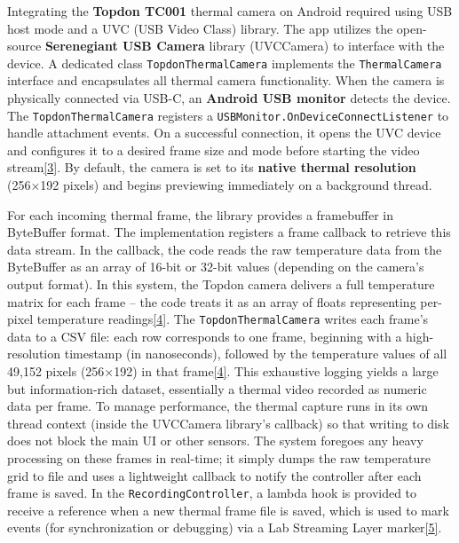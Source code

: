 \documentclass[12pt,a4paper]{article}
\begin{document}
Integrating the \textbf{Topdon TC001} thermal camera on Android required using USB host mode and a UVC (USB Video Class) library. The app utilizes the open-source \textbf{Serenegiant USB Camera} library (UVCCamera) to interface with the device. A dedicated class \passthrough{\lstinline!TopdonThermalCamera!} implements the \passthrough{\lstinline!ThermalCamera!} interface and encapsulates all thermal camera functionality. When the camera is physically connected via USB-C, an \textbf{Android USB monitor} detects the device. The \passthrough{\lstinline!TopdonThermalCamera!} registers a \passthrough{\lstinline!USBMonitor.OnDeviceConnectListener!} to handle attachment events. On a successful connection, it opens the UVC device and configures it to a desired frame size and mode before starting the video stream\href{https://github.com/buccancs/GSR-Dual-Video-System/blob/05ae360cb7b4ae7c7861f72deb235ad64a74b38e/android/app/src/main/java/com/yourcompany/gsrcapture/hardware/TopdonThermalCamera.kt\#L84-L92}{{[}3{]}}. By default, the camera is set to its \textbf{native thermal resolution} (256×192 pixels) and begins previewing immediately on a background thread.

For each incoming thermal frame, the library provides a framebuffer in ByteBuffer format. The implementation registers a frame callback to retrieve this data stream. In the callback, the code reads the raw temperature data from the ByteBuffer as an array of 16-bit or 32-bit values (depending on the camera's output format). In this system, the Topdon camera delivers a full temperature matrix for each frame -- the code treats it as an array of floats representing per-pixel temperature readings\href{https://github.com/buccancs/GSR-Dual-Video-System/blob/05ae360cb7b4ae7c7861f72deb235ad64a74b38e/android/app/src/main/java/com/yourcompany/gsrcapture/hardware/TopdonThermalCamera.kt\#L54-L62}{{[}4{]}}. The \passthrough{\lstinline!TopdonThermalCamera!} writes each frame's data to a CSV file: each row corresponds to one frame, beginning with a high-resolution timestamp (in nanoseconds), followed by the temperature values of all 49,152 pixels (256×192) in that frame\href{https://github.com/buccancs/GSR-Dual-Video-System/blob/05ae360cb7b4ae7c7861f72deb235ad64a74b38e/android/app/src/main/java/com/yourcompany/gsrcapture/hardware/TopdonThermalCamera.kt\#L54-L62}{{[}4{]}}. This exhaustive logging yields a large but information-rich dataset, essentially a thermal video recorded as numeric data per frame. To manage performance, the thermal capture runs in its own thread context (inside the UVCCamera library's callback) so that writing to disk does not block the main UI or other sensors. The system foregoes any heavy processing on these frames in real-time; it simply dumps the raw temperature grid to file and uses a lightweight callback to notify the controller after each frame is saved. In the \passthrough{\lstinline!RecordingController!}, a lambda hook is provided to receive a reference when a new thermal frame file is saved, which is used to mark events (for synchronization or debugging) via a Lab Streaming Layer marker\href{https://github.com/buccancs/GSR-Dual-Video-System/blob/05ae360cb7b4ae7c7861f72deb235ad64a74b38e/android/app/src/main/java/com/yourcompany/gsrcapture/controller/RecordingController.kt\#L28-L32}{{[}5{]}}.
\end{document}
